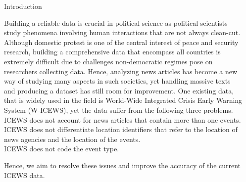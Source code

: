 \documentclass[final]{beamer}
\newlength{\sepwid}
\newlength{\onecolwid}
\begin{document}
\begin{frame}[t]
\begin{columns}[t]
\begin{column}{\onecolwid}

\begin{block}{Introduction}

\noindent Building a reliable data is crucial in political science as political scientists study phenomena involving human interactions that are not always clean-cut. Although domestic protest is one of the central interest of peace and security research, building a comprehensive data that encompass all countries is extremely difficult due to challenges non-democratic regimes pose on researchers collecting data. Hence, analyzing news articles has become a new way of studying many aspects in such societies, yet handling massive texts and producing a dataset has still room for improvement. One existing data, that is widely used in the field is World-Wide Integrated Crisis Early Warning System (W-ICEWS)\cite{icews}, yet the data suffer from the following three problems.\\
\vspace{1cm}
 ICEWS does not account for news articles that contain more than one events. \\
 ICEWS does not differentiate location identifiers that refer to the location of news agencies and the location of the events.\\
 ICEWS does not code the event type.

\noindent Hence, we aim to resolve these issues and improve the accuracy of the current ICEWS data. \\
\end{block}




\end{column} %

\begin{column}{\sepwid}\end{column} %


\end{columns}
\end{frame}
\end{document}
